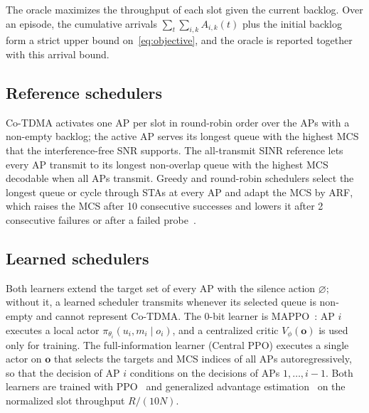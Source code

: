 \documentclass{ieeeaccess}
\begin{document}
The oracle maximizes the throughput of each slot given the current backlog. Over an episode, the cumulative arrivals $\sum_t \sum_{i,k} A_{i,k}(t)$ plus the initial backlog form a strict upper bound on~\eqref{eq:objective}, and the oracle is reported together with this arrival bound.

\subsection{Reference schedulers}
Co-TDMA activates one AP per slot in round-robin order over the APs with a non-empty backlog; the active AP serves its longest queue with the highest MCS that the interference-free SNR supports. The all-transmit SINR reference lets every AP transmit to its longest non-overlap queue with the highest MCS decodable when all APs transmit. Greedy and round-robin schedulers select the longest queue or cycle through STAs at every AP and adapt the MCS by ARF, which raises the MCS after 10 consecutive successes and lowers it after 2 consecutive failures or after a failed probe~\cite{kamerman1997arf}.

\subsection{Learned schedulers}
Both learners extend the target set of every AP with the silence action $\varnothing$; without it, a learned scheduler transmits whenever its selected queue is non-empty and cannot represent Co-TDMA. The 0-bit learner is MAPPO~\cite{yu2022mappo}: AP $i$ executes a local actor $\pi_{\theta_i}(u_i, m_i \mid o_i)$, and a centralized critic $V_\phi(\mathbf{o})$ is used only for training. The full-information learner (Central PPO) executes a single actor on $\mathbf{o}$ that selects the targets and MCS indices of all APs autoregressively, so that the decision of AP $i$ conditions on the decisions of APs $1,\dots,i-1$. Both learners are trained with PPO~\cite{schulman2017ppo} and generalized advantage estimation~\cite{schulman2016gae} on the normalized slot throughput $R/(10N)$.
\end{document}
